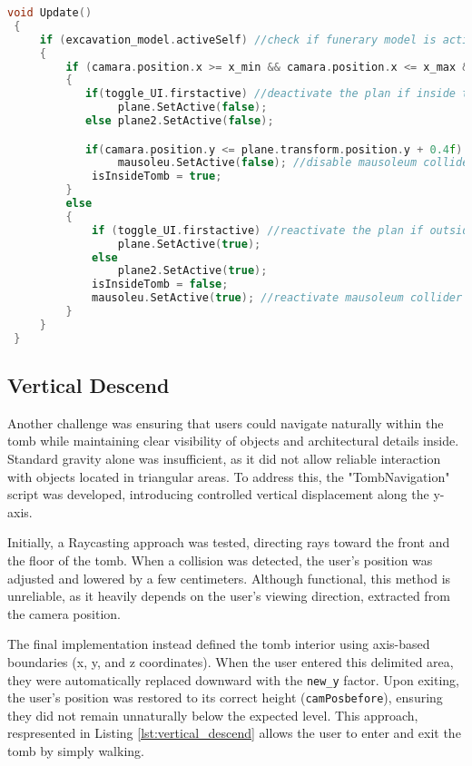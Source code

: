 \begin{lstlisting}[language=C++, caption={Plan Removal approach in Update method().}, label={lst:plan_removal}]
 void Update()
 {
     if (excavation_model.activeSelf) //check if funerary model is active
     {
         if (camara.position.x >= x_min && camara.position.x <= x_max && camara.position.z <= z_max && camara.position.z >= z_min && camara.position.y <= y_max && camara.position.y >= y_min)
         {
            if(toggle_UI.firstactive) //deactivate the plan if inside the tomb area
                 plane.SetActive(false);
            else plane2.SetActive(false);

            if(camara.position.y <= plane.transform.position.y + 0.4f) 
                 mausoleu.SetActive(false); //disable mausoleum collider so the user can fall inside the tomb without colliding
             isInsideTomb = true;
         }
         else
         {
             if (toggle_UI.firstactive) //reactivate the plan if outside the tomb area
                 plane.SetActive(true);
             else
                 plane2.SetActive(true);
             isInsideTomb = false;
             mausoleu.SetActive(true); //reactivate mausoleum collider 
         }
     }
 }
\end{lstlisting}
\subsection*{Vertical Descend}

Another challenge was ensuring that users could navigate naturally within the tomb while maintaining clear visibility of objects and architectural details inside. Standard gravity alone was insufficient, as it did not allow reliable interaction with objects located in triangular areas.
To address this, the "TombNavigation" script was developed, introducing controlled vertical displacement along the y-axis.

Initially, a Raycasting approach was tested, directing rays toward the front and the floor of the tomb. When a collision was detected, the user’s position was adjusted and lowered by a few centimeters. Although functional, this method is unreliable, as it heavily depends on the user’s viewing direction, extracted from the camera position.

The final implementation instead defined the tomb interior using axis-based boundaries (x, y, and z coordinates). 
When the user entered this delimited area, they were automatically replaced downward with the \texttt{new\_y} factor. Upon exiting, the user’s position was restored to its correct height (\texttt{camPosbefore}), ensuring they did not remain unnaturally below the expected level. 
This approach, respresented in Listing \ref{lst:vertical_descend} allows the user to enter and exit the tomb by simply walking.

